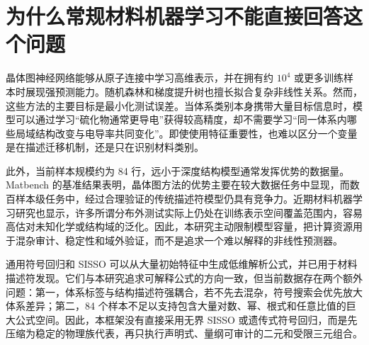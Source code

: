 \section{为什么常规材料机器学习不能直接回答这个问题}

晶体图神经网络能够从原子连接中学习高维表示，并在拥有约 $10^4$ 或更多训练样本时展现强预测能力\cite{Xie2018,Dunn2020}。随机森林和梯度提升树也擅长拟合复杂非线性关系。然而，这些方法的主要目标是最小化测试误差。当体系类别本身携带大量目标信息时，模型可以通过学习“硫化物通常更导电”获得较高精度，却不需要学习“同一体系内哪些局域结构改变与电导率共同变化”。即使使用特征重要性，也难以区分一个变量是在描述迁移机制，还是只在识别材料类别。

此外，当前样本规模约为 84 行，远小于深度结构模型通常发挥优势的数据量。Matbench 的基准结果表明，晶体图方法的优势主要在较大数据任务中显现，而数百样本级任务中，经过合理验证的传统描述符模型仍具有竞争力\cite{Dunn2020}。近期材料机器学习研究也显示，许多所谓分布外测试实际上仍处在训练表示空间覆盖范围内，容易高估对未知化学或结构域的泛化\cite{Li2025}。因此，本研究主动限制模型容量，把计算资源用于混杂审计、稳定性和域外验证，而不是追求一个难以解释的非线性预测器。

通用符号回归和 SISSO 可以从大量初始特征中生成低维解析公式，并已用于材料描述符发现\cite{Ouyang2018}。它们与本研究追求可解释公式的方向一致，但当前数据存在两个额外问题：第一，体系标签与结构描述符强耦合，若不先去混杂，符号搜索会优先放大体系差异；第二，84 个样本不足以支持包含大量对数、幂、根式和任意比值的巨大公式空间。因此，本框架没有直接采用无界 SISSO 或遗传式符号回归，而是先压缩为稳定的物理族代表，再只执行声明式、量纲可审计的二元和受限三元组合。

